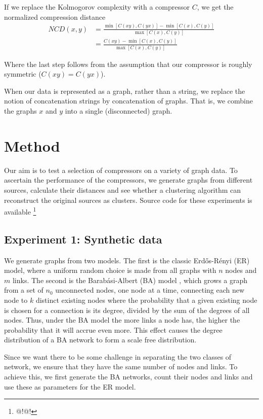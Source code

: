\documentclass[10pt,a4paper,oneside]{article}
\begin{document}
If we replace the Kolmogorov complexity with a compressor $C$, we get the normalized compression distance
\begin{align*}
NCD(x, y) 
	&= \frac{\min \left [C(xy), C(yx)\right ] - \min \left[C(x), C(y)\right]}{\max \left [C(x), C(y) \right ]}\\
	&= \frac{C(xy) - \min \left[C(x), C(y)\right]}{\max \left [C(x), C(y) \right ]} 
\end{align*}
 
Where the last step follows from the assumption that our compressor is roughly symmetric ($C(xy) = C(yx)$).

When our data is represented as a graph, rather than a string, we replace the notion of concatenation strings by concatenation of graphs. That is, we combine the graphs $x$ and $y$ into a single (disconnected) graph.

\section*{Method}

Our aim is to test a selection of compressors on a variety of graph data. To ascertain the performance of the compressors, we generate graphs from different sources, calculate their distances and see whether a clustering algorithm can reconstruct the original sources as clusters. Source code for these experiments is available \footnote{@!@!}

\subsection*{Experiment 1: Synthetic data}

We generate graphs from two models. The first is the classic Erd\H{o}s-R\'enyi (ER) model, where a uniform random choice is made from all graphs with $n$ nodes and $m$ links. The second is the Barab\'asi-Albert (BA) model \cite{albert2002statistical}, which grows a graph from a set of $n_0$ unconnected nodes, one node at a time, connecting each new node to $k$ distinct existing nodes where the probability that a given existing node is chosen for a connection is its degree, divided by the sum of the degrees of all nodes. Thus, under the BA model the more links a node has, the higher the probability that it will accrue even more. This effect causes the degree distribution of a BA network to form a scale free distribution.

Since we want there to be some challenge in separating the two classes of network, we ensure that they have the same number of nodes and links. To achieve this, we first generate the BA networks, count their nodes and links and use these as parameters for the ER model. 
\end{document}
